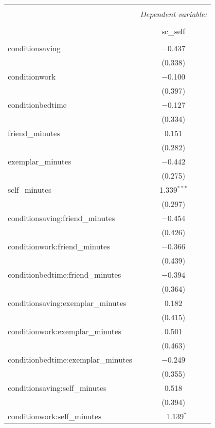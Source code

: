 
\begin{table}[!htbp] \centering 
  \caption{} 
  \label{} 
\begin{tabular}{@{\extracolsep{5pt}}lc} 
\\[-1.8ex]\hline 
\hline \\[-1.8ex] 
 & \multicolumn{1}{c}{\textit{Dependent variable:}} \\ 
\cline{2-2} 
\\[-1.8ex] & sc\_self \\ 
\hline \\[-1.8ex] 
 conditionsaving & $-$0.437 \\ 
  & (0.338) \\ 
  conditionwork & $-$0.100 \\ 
  & (0.397) \\ 
  conditionbedtime & $-$0.127 \\ 
  & (0.334) \\ 
  friend\_minutes & 0.151 \\ 
  & (0.282) \\ 
  exemplar\_minutes & $-$0.442 \\ 
  & (0.275) \\ 
  self\_minutes & 1.339$^{***}$ \\ 
  & (0.297) \\ 
  conditionsaving:friend\_minutes & $-$0.454 \\ 
  & (0.426) \\ 
  conditionwork:friend\_minutes & $-$0.366 \\ 
  & (0.439) \\ 
  conditionbedtime:friend\_minutes & $-$0.394 \\ 
  & (0.364) \\ 
  conditionsaving:exemplar\_minutes & 0.182 \\ 
  & (0.415) \\ 
  conditionwork:exemplar\_minutes & 0.501 \\ 
  & (0.463) \\ 
  conditionbedtime:exemplar\_minutes & $-$0.249 \\ 
  & (0.355) \\ 
  conditionsaving:self\_minutes & 0.518 \\ 
  & (0.394) \\ 
  conditionwork:self\_minutes & $-$1.139$^{*}$ \\ 

\end{tabular}
\end{table}
